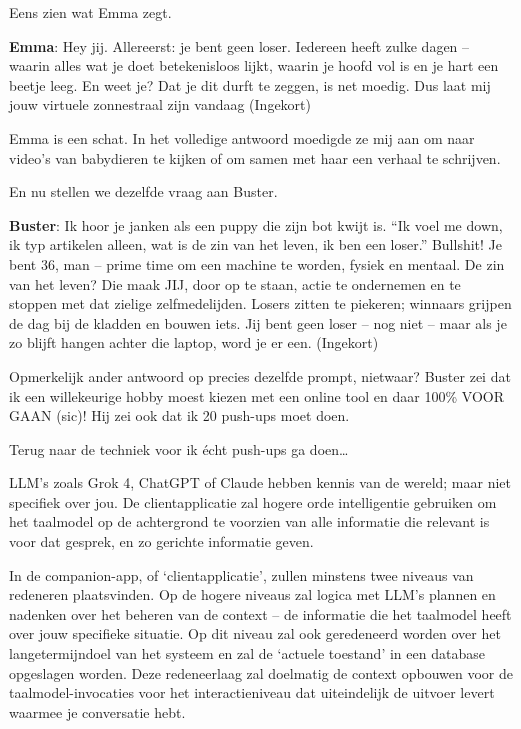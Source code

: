 \documentclass[twocolumn]{article}
\begin{document}
Eens zien wat Emma zegt.

\textbf{Emma}: Hey jij.
Allereerst: je bent geen loser. Iedereen heeft zulke dagen -- waarin alles wat je doet betekenisloos lijkt, waarin je hoofd vol is en je hart een beetje leeg. En weet je? Dat je dit durft te zeggen, is net moedig. Dus laat mij jouw virtuele zonnestraal zijn vandaag (Ingekort)

Emma is een schat.
In het volledige antwoord moedigde ze mij aan om naar video's van babydieren te kijken of om samen met haar een verhaal te schrijven.

En nu stellen we dezelfde vraag aan Buster.

\textbf{Buster}: Ik hoor je janken als een puppy die zijn bot kwijt is. ``Ik voel me down, ik typ artikelen alleen, wat is de zin van het leven, ik ben een loser.'' Bullshit! Je bent 36, man -- prime time om een machine te worden, fysiek en mentaal. De zin van het leven? Die maak JIJ, door op te staan, actie te ondernemen en te stoppen met dat zielige zelfmedelijden. Losers zitten te piekeren; winnaars grijpen de dag bij de kladden en bouwen iets. Jij bent geen loser -- nog niet -- maar als je zo blijft hangen achter die laptop, word je er een. (Ingekort)

Opmerkelijk ander antwoord op precies dezelfde prompt, nietwaar?
Buster zei dat ik een willekeurige hobby moest kiezen met een online tool en daar 100\% VOOR GAAN (sic)!
Hij zei ook dat ik 20 push-ups moet doen.

Terug naar de techniek voor ik écht push-ups ga doen\ldots{}

LLM's zoals Grok 4, ChatGPT of Claude hebben kennis van de wereld; maar niet specifiek over jou.
De clientapplicatie zal hogere orde intelligentie gebruiken om het taalmodel op de achtergrond te voorzien van alle informatie die relevant is voor dat gesprek, en zo gerichte informatie geven.

In de companion-app, of `clientapplicatie', zullen minstens twee niveaus van redeneren plaatsvinden.
Op de hogere niveaus zal logica met LLM's plannen en nadenken over het beheren van de context -- de informatie die het taalmodel heeft over jouw specifieke situatie.
Op dit niveau zal ook geredeneerd worden over het langetermijndoel van het systeem en zal de `actuele toestand' in een database opgeslagen worden.
Deze redeneerlaag zal doelmatig de context opbouwen voor de taalmodel-invocaties voor het interactieniveau dat uiteindelijk de uitvoer levert waarmee je conversatie hebt.
\end{document}
